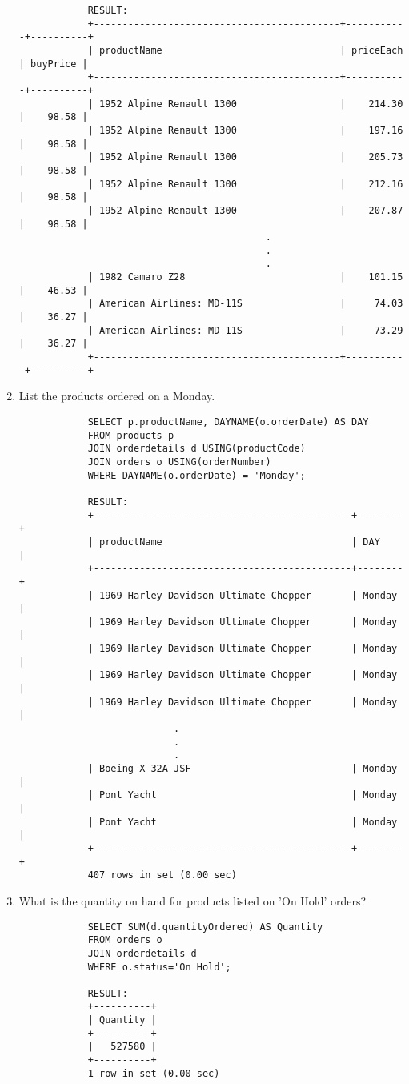 \documentclass{article}
\begin{document}
\begin{enumerate}
\begin{verbatim}
			RESULT:
			+-------------------------------------------+-----------+----------+
			| productName                               | priceEach | buyPrice |
			+-------------------------------------------+-----------+----------+
			| 1952 Alpine Renault 1300                  |    214.30 |    98.58 |
			| 1952 Alpine Renault 1300                  |    197.16 |    98.58 |
			| 1952 Alpine Renault 1300                  |    205.73 |    98.58 |
			| 1952 Alpine Renault 1300                  |    212.16 |    98.58 |
			| 1952 Alpine Renault 1300                  |    207.87 |    98.58 |
			                               .
			                               .
			                               .
			| 1982 Camaro Z28                           |    101.15 |    46.53 |
			| American Airlines: MD-11S                 |     74.03 |    36.27 |
			| American Airlines: MD-11S                 |     73.29 |    36.27 |
			+-------------------------------------------+-----------+----------+
			\end{verbatim}
		\item List the products ordered on a Monday.
			\begin{verbatim}
			SELECT p.productName, DAYNAME(o.orderDate) AS DAY
			FROM products p
			JOIN orderdetails d USING(productCode)
			JOIN orders o USING(orderNumber)
			WHERE DAYNAME(o.orderDate) = 'Monday';
			
			RESULT:
			+---------------------------------------------+--------+
			| productName                                 | DAY    |
			+---------------------------------------------+--------+
			| 1969 Harley Davidson Ultimate Chopper       | Monday |
			| 1969 Harley Davidson Ultimate Chopper       | Monday |
			| 1969 Harley Davidson Ultimate Chopper       | Monday |
			| 1969 Harley Davidson Ultimate Chopper       | Monday |
			| 1969 Harley Davidson Ultimate Chopper       | Monday |
                           .
                           .
                           .
			| Boeing X-32A JSF                            | Monday |
			| Pont Yacht                                  | Monday |
			| Pont Yacht                                  | Monday |
			+---------------------------------------------+--------+
			407 rows in set (0.00 sec)
			\end{verbatim}
		\item What is the quantity on hand for products listed on 'On Hold' orders?
			\begin{verbatim}
			SELECT SUM(d.quantityOrdered) AS Quantity
			FROM orders o
			JOIN orderdetails d
			WHERE o.status='On Hold';
			
			RESULT:
			+----------+
			| Quantity |
			+----------+
			|   527580 |
			+----------+
			1 row in set (0.00 sec)
			\end{verbatim}
	\end{enumerate}
\end{document}
